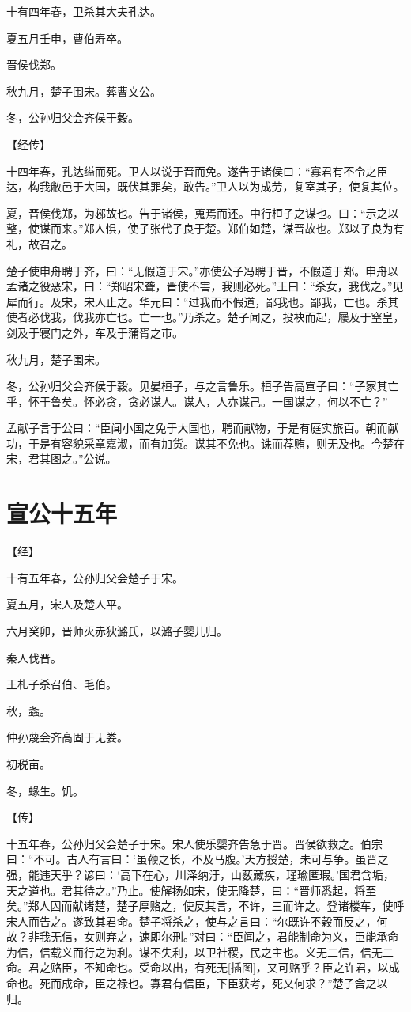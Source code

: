 \documentclass[a4paper,12pt,UTF8,twoside]{ctexbook}
\begin{document}
十有四年春，卫杀其大夫孔达。

夏五月壬申，曹伯寿卒。

晋侯伐郑。

秋九月，楚子围宋。葬曹文公。

冬，公孙归父会齐侯于穀。

【经传】

十四年春，孔达缢而死。卫人以说于晋而免。遂告于诸侯曰：“寡君有不令之臣达，构我敝邑于大国，既伏其罪矣，敢告。”卫人以为成劳，复室其子，使复其位。

夏，晋侯伐郑，为邲故也。告于诸侯，蒐焉而还。中行桓子之谋也。曰：“示之以整，使谋而来。”郑人惧，使子张代子良于楚。郑伯如楚，谋晋故也。郑以子良为有礼，故召之。

楚子使申舟聘于齐，曰：“无假道于宋。”亦使公子冯聘于晋，不假道于郑。申舟以孟诸之役恶宋，曰：“郑昭宋聋，晋使不害，我则必死。”王曰：“杀女，我伐之。”见犀而行。及宋，宋人止之。华元曰：“过我而不假道，鄙我也。鄙我，亡也。杀其使者必伐我，伐我亦亡也。亡一也。”乃杀之。楚子闻之，投袂而起，屦及于窒皇，剑及于寝门之外，车及于蒲胥之市。

秋九月，楚子围宋。

冬，公孙归父会齐侯于穀。见晏桓子，与之言鲁乐。桓子告高宣子曰：“子家其亡乎，怀于鲁矣。怀必贪，贪必谋人。谋人，人亦谋己。一国谋之，何以不亡？”

孟献子言于公曰：“臣闻小国之免于大国也，聘而献物，于是有庭实旅百。朝而献功，于是有容貌采章嘉淑，而有加货。谋其不免也。诛而荐贿，则无及也。今楚在宋，君其图之。”公说。

\section{宣公十五年}



【经】

十有五年春，公孙归父会楚子于宋。

夏五月，宋人及楚人平。

六月癸卯，晋师灭赤狄潞氏，以潞子婴儿归。

秦人伐晋。

王札子杀召伯、毛伯。

秋，螽。

仲孙蔑会齐高固于无娄。

初税亩。

冬，蝝生。饥。

【传】

十五年春，公孙归父会楚子于宋。宋人使乐婴齐告急于晋。晋侯欲救之。伯宗曰：“不可。古人有言曰：‘虽鞭之长，不及马腹。’天方授楚，未可与争。虽晋之强，能违天乎？谚曰：‘高下在心，川泽纳汙，山薮藏疾，瑾瑜匿瑕。’国君含垢，天之道也。君其待之。”乃止。使解扬如宋，使无降楚，曰：“晋师悉起，将至矣。”郑人囚而献诸楚，楚子厚赂之，使反其言，不许，三而许之。登诸楼车，使呼宋人而告之。遂致其君命。楚子将杀之，使与之言曰：“尔既许不穀而反之，何故？非我无信，女则弃之，速即尔刑。”对曰：“臣闻之，君能制命为义，臣能承命为信，信载义而行之为利。谋不失利，以卫社稷，民之主也。义无二信，信无二命。君之赂臣，不知命也。受命以出，有死无[插图]，又可赂乎？臣之许君，以成命也。死而成命，臣之禄也。寡君有信臣，下臣获考，死又何求？”楚子舍之以归。
\end{document}
